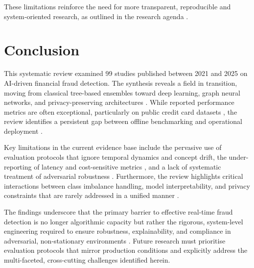 \documentclass[a4paper,fleqn]{cas-dc}
\begin{document}
These limitations reinforce the need for more transparent, reproducible and system‑oriented research, as outlined in the research agenda \cite{parkar_comparative_2024, mienye_deep_2024}.

\section{Conclusion}
This systematic review examined 99 studies published between 2021 and 2025 on AI-driven financial fraud detection. 
The synthesis reveals a field in transition, moving from classical tree-based ensembles toward deep learning, graph neural networks, and privacy-preserving architectures \cite{cherif_credit_2023, sarna_ai_2025, deng_transformer-based_2025, li_fedgat-dcnn_2024, ahmed_secure_2024}. 
While reported performance metrics are often exceptional, particularly on public credit card datasets \cite{alfaiz_enhanced_2022, adil_optdevnet_2024, ileberi_hybrid_2024, zhao_improved_2024}, the review identifies a persistent gap between offline benchmarking and operational deployment \cite{mill_opportunities_2023, van_belle_shine_2024, sarna_ai_2025}.

Key limitations in the current evidence base include the pervasive use of evaluation protocols that ignore temporal dynamics and concept drift, the under-reporting of latency and cost-sensitive metrics \cite{mill_opportunities_2023, wang_integrating_2022, zhao_improved_2024, van_belle_shine_2024}, and a lack of systematic treatment of adversarial robustness \cite{sarna_ai_2025, ahmed_secure_2024, cherif_credit_2023}. 
Furthermore, the review highlights critical interactions between class imbalance handling, model interpretability, and privacy constraints that are rarely addressed in a unified manner \cite{mill_opportunities_2023, chen_deep_2025, parkar_comparative_2024, iqbal_efficient_2025}.

The findings underscore that the primary barrier to effective real-time fraud detection is no longer algorithmic capacity but rather the rigorous, system-level engineering required to ensure robustness, explainability, and compliance in adversarial, non-stationary environments \cite{mill_opportunities_2023, sarna_ai_2025, van_belle_shine_2024, chen_deep_2025}. 
Future research must prioritise evaluation protocols that mirror production conditions and explicitly address the multi-faceted, cross-cutting challenges identified herein.

\clearpage
\printcredits
\clearpage


\end{document}
